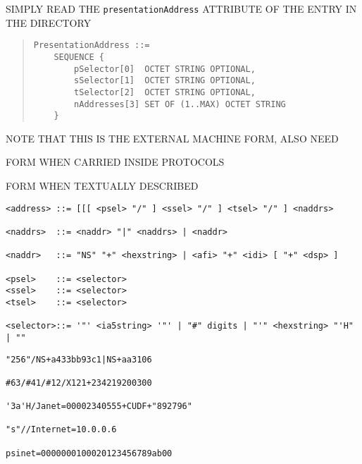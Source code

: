 \begin{bwslide}

\begin{nrtc}
\item	SIMPLY READ THE \verb"presentationAddress" ATTRIBUTE OF THE ENTRY IN
	THE DIRECTORY
\begin{quote}\small\begin{verbatim}
PresentationAddress ::=
    SEQUENCE {
        pSelector[0]  OCTET STRING OPTIONAL,
        sSelector[1]  OCTET STRING OPTIONAL,
        tSelector[2]  OCTET STRING OPTIONAL,
        nAddresses[3] SET OF (1..MAX) OCTET STRING
    }
\end{verbatim}\end{quote}

\item	NOTE THAT THIS IS THE EXTERNAL MACHINE FORM, ALSO NEED
    \begin{nrtc}
    \item	FORM WHEN CARRIED INSIDE PROTOCOLS

    \item	FORM WHEN TEXTUALLY DESCRIBED
    \end{nrtc}
\end{nrtc}
\end{bwslide}


\begin{bwslide}

\smaller
\begin{verbatim}
<address> ::= [[[ <psel> "/" ] <ssel> "/" ] <tsel> "/" ] <naddrs>

<naddrs>  ::= <naddr> "|" <naddrs> | <naddr>

<naddr>   ::= "NS" "+" <hexstring> | <afi> "+" <idi> [ "+" <dsp> ]

<psel>    ::= <selector>
<ssel>    ::= <selector>
<tsel>    ::= <selector>

<selector>::= '"' <ia5string> '"' | "#" digits | "'" <hexstring> "'H" | ""
\end{verbatim}
\end{bwslide}


\begin{bwslide}

\begin{verbatim}
"256"/NS+a433bb93c1|NS+aa3106

#63/#41/#12/X121+234219200300

'3a'H/Janet=00002340555+CUDF+"892796"

"s"//Internet=10.0.0.6

psinet=0000000100020123456789ab00
\end{verbatim}
\end{bwslide}


